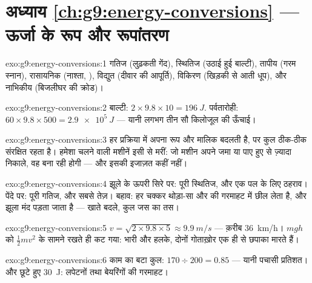 \section*{अध्याय \ref{ch:g9:energy-conversions} --- ऊर्जा के रूप और रूपांतरण}

\begin{solution}{exo:g9:energy-conversions:1}
गतिज (लुढ़कती गेंद), स्थितिज (उठाई हुई बाल्टी), तापीय (गरम स्नान),
रासायनिक (नाश्ता, ), विद्युत (दीवार की आपूर्ति), विकिरण (खिड़की
से आती धूप), और नाभिकीय (बिजलीघर की क्रोड)।
\end{solution}

\begin{solution}{exo:g9:energy-conversions:2}
बाल्टी: $2 \times 9.8 \times 10 = \qty{196}{J}$. पर्वतारोही: $60
\times 9.8 \times 500 = \qty{2.9e5}{J}$ --- यानी लगभग तीन सौ किलोजूल
की ऊँचाई।
\end{solution}

\begin{solution}{exo:g9:energy-conversions:3}
हर प्रक्रिया में  अपना रूप और मालिक बदलती है, पर कुल ठीक-ठीक
संरक्षित रहता है। हमेशा चलने वाली मशीनें इसी से मरीं: जो मशीन अपने जमा
या पाए हुए से ज़्यादा निकाले, वह  बना रही होगी --- और इसकी इजाज़त
कहीं नहीं।
\end{solution}

\begin{solution}{exo:g9:energy-conversions:4}
झूले के ऊपरी सिरे पर: पूरी स्थितिज, और एक पल के लिए ठहराव। पेंदे पर:
पूरी गतिज, और सबसे तेज़। बहाव: हर चक्कर थोड़ा-सा  और  की गरमाहट
में छील लेता है, और झूला मंद पड़ता जाता है --- खाते बदले, कुल जस का
तस।
\end{solution}

\begin{solution}{exo:g9:energy-conversions:5}
$v = \sqrt{2 \times 9.8 \times 5} \approx \qty{9.9}{m/s}$ ---
क़रीब \qty{36}{km/h}। $m g h$ को $\frac12 m v^2$ के सामने रखते ही
 कट गया: भारी और हलके, दोनों गोताख़ोर एक ही  से छपाका
मारते हैं।
\end{solution}

\begin{solution}{exo:g9:energy-conversions:6}
काम का बटा कुल: $170 \div 200 = 0.85$ --- यानी पचासी प्रतिशत। और छूटे
हुए \qty{30}{J}: लपेटनों तथा बेयरिंगों की गरमाहट।
\end{solution}

